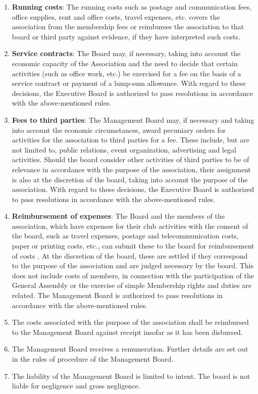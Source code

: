 \documentclass{article}
\begin{document}
\begin{enumerate}
	\item \textbf{Running costs}: The running costs such as postage and communication fees, office supplies, rent and office costs, travel expenses, etc. covers the association from the membership fees or reimburses the association to that board or third party against evidence, if they have interpreted such costs.
	\item \textbf{Service contracts}: The Board may, if necessary, taking into account the economic capacity of the Association and the need to decide that certain activities (such as office work, etc.) be exercised for a fee on the basis of a service contract or payment of a lump-sum allowance. 
	With regard to these decisions, the Executive Board is authorized to pass resolutions in accordance with the above-mentioned rules.
	\item \textbf{Fees to third parties}: The Management Board may, if necessary and taking into account the economic circumstances, award pecuniary orders for activities for the association to third parties for a fee. 
	These include, but are not limited to, public relations, event organization, advertising and legal activities. 
	Should the board consider other activities of third parties to be of relevance in accordance with the purpose of the association, their assignment is also at the discretion of the board, taking into account the purpose of the association. 
	With regard to these decisions, the Executive Board is authorized to pass resolutions in accordance with the above-mentioned rules.
	\item \textbf{Reimbursement of expenses}: The Board and the members of the association, which have expenses for their club activities with the consent of the board, such as travel expenses, postage and telecommunication costs, paper or printing costs, etc., can submit these to the board for reimbursement of costs , At the discretion of the board, these are settled if they correspond to the purpose of the association and are judged necessary by the board. 
	This does not include costs of members, in connection with the participation of the General Assembly or the exercise of simple Membership rights and duties are related.
	 The Management Board is authorized to pass resolutions in accordance with the above-mentioned rules.

	\item The costs associated with the purpose of the association shall be reimbursed to the Management Board against receipt insofar as it has been disbursed.
	\item The Management Board receives a remuneration.
	 Further details are set out in the rules of procedure of the Management Board.
	\item The liability of the Management Board is limited to intent. 
	The board is not liable for negligence and gross negligence.
\end{enumerate}
\end{document}
